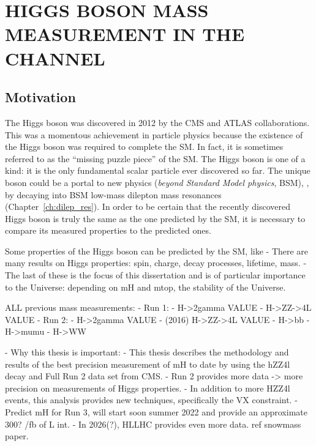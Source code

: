 \chapter{HIGGS BOSON MASS MEASUREMENT IN THE \texorpdfstring{\hzzfourl}{H to ZZ to 4l} CHANNEL}
\label{ch:higgs_mass}
\section{Motivation}
The Higgs boson was discovered in 2012 by the CMS and ATLAS collaborations.
This was a momentous achievement in particle physics because the existence of the Higgs boson was required to complete the SM.
In fact, it is sometimes referred to as the ``missing puzzle piece'' of the SM.
The Higgs boson is one of a kind: it is the only fundamental scalar particle ever discovered so far.
The unique boson could be a portal to new physics (\emph{beyond Standard Model physics}, BSM), \eg, by decaying into BSM low-mass dilepton mass resonances (Chapter~\ref{ch:dilep_res}).
In order to be certain that the recently discovered Higgs boson is truly the same as the one predicted by the SM, it is necessary to compare its measured properties to the predicted ones.

Some properties of the Higgs boson can be predicted by the SM, like 
    - There are many results on Higgs properties: spin, charge, decay processes, lifetime, mass.
    - The last of these is the focus of this dissertation and is of particular importance to the Universe: depending on mH and mtop, the stability of the Universe.

ALL previous mass measurements:
    - Run 1:
        - H->2gamma VALUE
        - H->ZZ->4L VALUE
    - Run 2:
        - H->2gamma VALUE
        - (2016) H->ZZ->4L VALUE
        - H->bb
        - H->mumu
        - H->WW 

- Why this thesis is important:
    - This thesis describes the methodology and results of the best precision measurement of mH to date by using the hZZ4l decay and Full Run 2 data set from CMS.
    - Run 2 provides more data -> more precision on measurements of Higgs properties.
    - In addition to more HZZ4l events, this analysis provides new techniques, specifically the VX constraint.
    - Predict mH for Run 3, will start soon summer 2022 and provide an approximate 300? /fb of L int.
    - In 2026(?), HLLHC provides even more data. ref snowmass paper.

